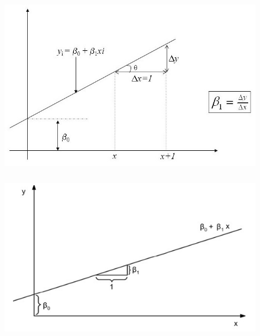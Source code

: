 \documentclass[14pt,aspectratio=1610]{beamer}
\begin{document}
\begin{frame}{}
\frametitle{ }
\begin{block}{}
\begin{figure}[H]
    \centering
    \includegraphics[scale=0.5]{Figuras/Interpretacao2}
\end{figure}
\end{block}
\end{frame}
% 
\begin{frame}{}
\frametitle{ }
\begin{block}{}
\justifying
\begin{figure}[H]
    \centering
    \includegraphics[scale=0.5]{Figuras/Interpretacao1}
\end{figure}
\end{block}
\end{frame}
\end{document}
